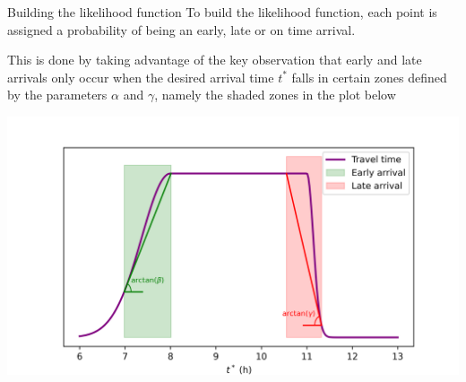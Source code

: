 \documentclass{beamer}
\begin{document}
\begin{frame}{Building the likelihood function}
  To build the likelihood function, each point is assigned a probability of being an early, late or on time arrival.

  This is done by taking advantage of the key observation that early and late arrivals only occur when the desired arrival time \(t^*\) falls in certain zones defined by the parameters \(\alpha\) and \(\gamma\), namely the shaded zones in the plot below

  \begin{center}
    \includegraphics[width=.9\textwidth]{tt_early_late}
  \end{center}
\end{frame}
\end{document}
